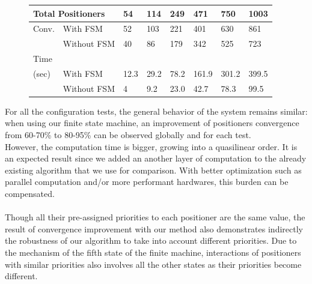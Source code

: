 \documentclass[]{spie}  %
\begin{document}
\begin{figure}[H]
\begin{minipage}{9cm}
{				\tiny
				\begin{tabular}{|l|l|l|l|l|l|l|l|}
					\hline
					\multicolumn{2}{|l|}{Total Positioners}  & 54 & 114 & 249 & 471 & 750 & 1003\\
					\hline
					Conv. & With FSM  & 52 & 103 & 221 & 401 & 630 & 861 \\
					\cline{2-8}
					& Without FSM & 40  & 86 & 179 & 342 & 525 & 723 \\
					\hline
					Time\\(sec) & With FSM  & 12.3 & 29.2 & 78.2 & 161.9 & 301.2 & 399.5 \\
					\cline{2-8}
					& Without FSM  & 4  & 9.2 & 23.0 & 42.7 & 78.3  & 99.5 \\
					\hline
				\end{tabular}}
				\label{configuration8_result} 
			\end{minipage}
		\end{figure}					
	For all the configuration tests, the general behavior of the system remains similar: when using our finite state machine, an improvement of positioners convergence from 60-70\% to 80-95\% can be observed globally and for each test.\\
	 However, the computation time is bigger, growing into a quasilinear order. It is an expected result since we added an another layer of computation to the already existing algorithm that we use for comparison. With better optimization such as parallel computation and/or more performant hardwares, this burden can be compensated.\\\\
	 Though all their pre-assigned priorities to each positioner are the same value, the result of convergence improvement with our method also demonstrates indirectly the robustness of our algorithm to take into account different priorities. Due to the mechanism of the fifth state of the finite machine, interactions of positioners with similar priorities also involves all the other states as their priorities become different. 	
\end{document}
